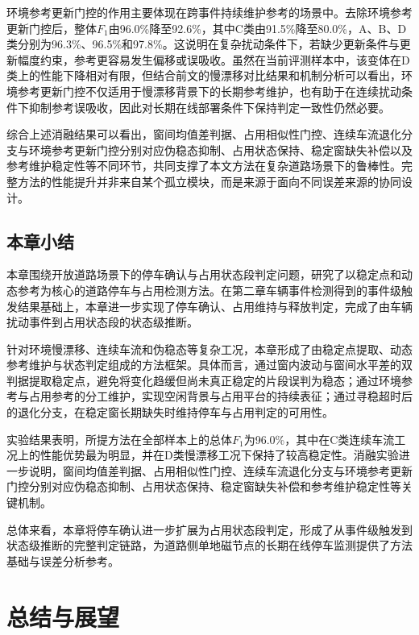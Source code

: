 \documentclass{xdupgthesis}
\begin{document}
环境参考更新门控的作用主要体现在跨事件持续维护参考的场景中。去除环境参考更新门控后，整体$F_1$由96.0\%降至92.6\%，其中C类由91.5\%降至80.0\%，A、B、D类分别为96.3\%、96.5\%和97.8\%。这说明在复杂扰动条件下，若缺少更新条件与更新幅度约束，参考更容易发生偏移或误吸收。虽然在当前评测样本中，该变体在D类上的性能下降相对有限，但结合前文的慢漂移对比结果和机制分析可以看出，环境参考更新门控不仅适用于慢漂移背景下的长期参考维护，也有助于在连续扰动条件下抑制参考误吸收，因此对长期在线部署条件下保持判定一致性仍然必要。

综合上述消融结果可以看出，窗间均值差判据、占用相似性门控、连续车流退化分支与环境参考更新门控分别对应伪稳态抑制、占用状态保持、稳定窗缺失补偿以及参考维护稳定性等不同环节，共同支撑了本文方法在复杂道路场景下的鲁棒性。完整方法的性能提升并非来自某个孤立模块，而是来源于面向不同误差来源的协同设计。

\section{本章小结}
\label{sec:ch4_summary}

本章围绕开放道路场景下的停车确认与占用状态段判定问题，研究了以稳定点和动态参考为核心的道路停车与占用检测方法。在第二章车辆事件检测得到的事件级触发结果基础上，本章进一步实现了停车确认、占用维持与释放判定，完成了由车辆扰动事件到占用状态段的状态级推断。

针对环境慢漂移、连续车流和伪稳态等复杂工况，本章形成了由稳定点提取、动态参考维护与状态判定组成的方法框架。具体而言，通过窗内波动与窗间水平差的双判据提取稳定点，避免将变化趋缓但尚未真正稳定的片段误判为稳态；通过环境参考与占用参考的分工维护，实现空闲背景与占用平台的持续表征；通过寻稳超时后的退化分支，在稳定窗长期缺失时维持停车与占用判定的可用性。

实验结果表明，所提方法在全部样本上的总体$F_1$为96.0\%，其中在C类连续车流工况上的性能优势最为明显，并在D类慢漂移工况下保持了较高稳定性。消融实验进一步说明，窗间均值差判据、占用相似性门控、连续车流退化分支与环境参考更新门控分别对应伪稳态抑制、占用状态保持、稳定窗缺失补偿和参考维护稳定性等关键机制。

总体来看，本章将停车确认进一步扩展为占用状态段判定，形成了从事件级触发到状态级推断的完整判定链路，为道路侧单地磁节点的长期在线停车监测提供了方法基础与误差分析参考。




\chapter{总结与展望}
\end{document}
